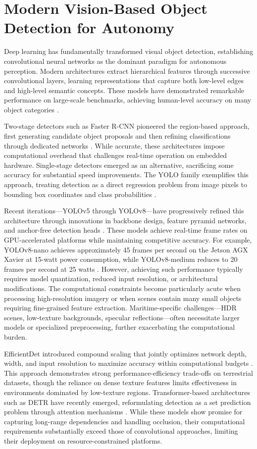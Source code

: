 \documentclass[../main.tex]{subfiles}
\begin{document}
\section{Modern Vision-Based Object Detection for Autonomy}

Deep learning has fundamentally transformed visual object detection, establishing convolutional neural networks as the dominant paradigm for autonomous perception. Modern architectures extract hierarchical features through successive convolutional layers, learning representations that capture both low-level edges and high-level semantic concepts. These models have demonstrated remarkable performance on large-scale benchmarks, achieving human-level accuracy on many object categories \cite{lecun1998, he2016}.

Two-stage detectors such as Faster R-CNN pioneered the region-based approach, first generating candidate object proposals and then refining classifications through dedicated networks \cite{girshick2014}. While accurate, these architectures impose computational overhead that challenges real-time operation on embedded hardware. Single-stage detectors emerged as an alternative, sacrificing some accuracy for substantial speed improvements. The YOLO family exemplifies this approach, treating detection as a direct regression problem from image pixels to bounding box coordinates and class probabilities \cite{ultralytics}.

Recent iterations—YOLOv5 through YOLOv8—have progressively refined this architecture through innovations in backbone design, feature pyramid networks, and anchor-free detection heads \cite{ultralytics}. These models achieve real-time frame rates on GPU-accelerated platforms while maintaining competitive accuracy. For example, YOLOv8-nano achieves approximately 45 frames per second on the Jetson AGX Xavier at 15-watt power consumption, while YOLOv8-medium reduces to 20 frames per second at 25 watts \cite{ultralytics, kim2022}. However, achieving such performance typically requires model quantization, reduced input resolution, or architectural modifications. The computational constraints become particularly acute when processing high-resolution imagery or when scenes contain many small objects requiring fine-grained feature extraction. Maritime-specific challenges—HDR scenes, low-texture backgrounds, specular reflections—often necessitate larger models or specialized preprocessing, further exacerbating the computational burden.

EfficientDet introduced compound scaling that jointly optimizes network depth, width, and input resolution to maximize accuracy within computational budgets \cite{tan2020}. This approach demonstrates strong performance-efficiency trade-offs on terrestrial datasets, though the reliance on dense texture features limits effectiveness in environments dominated by low-texture regions. Transformer-based architectures such as DETR have recently emerged, reformulating detection as a set prediction problem through attention mechanisms \cite{vaswani2017}. While these models show promise for capturing long-range dependencies and handling occlusion, their computational requirements substantially exceed those of convolutional approaches, limiting their deployment on resource-constrained platforms.
\end{document}
